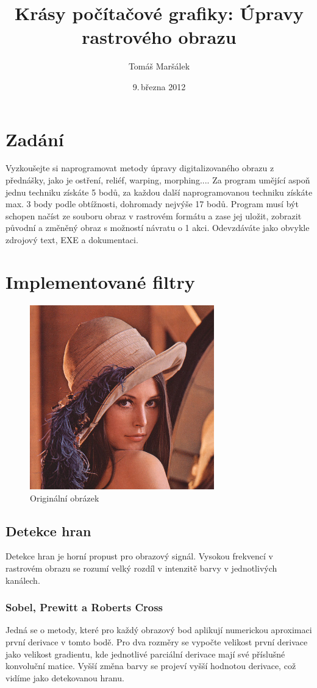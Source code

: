 \documentclass[11pt]{article}
\title{Krásy počítačové grafiky: Úpravy rastrového obrazu}
\author{Tomáš Maršálek}
\date{9.\,března 2012}
\begin{document}
\maketitle

\section{Zadání}
Vyzkoušejte si naprogramovat metody úpravy digitalizovaného obrazu z přednášky,
jako je ostření, reliéf, warping, morphing.... Za program umějící aspoň jednu
techniku získáte 5 bodů, za každou další naprogramovanou techniku získáte max.
3 body podle obtížnosti, dohromady nejvýše 17 bodů. Program musí být schopen
načíst ze souboru obraz v rastrovém formátu a zase jej uložit, zobrazit původní
a změněný obraz s možností návratu o 1 akci. Odevzdáváte jako obvykle zdrojový
text, EXE a dokumentaci.

\section{Implementované filtry}

\begin{figure}[ht!]
\centering
	\includegraphics[width=8cm]{lena.png}
	\caption{Originální obrázek}
\end{figure}

\subsection{Detekce hran}
Detekce hran je horní propust pro obrazový signál. Vysokou frekvencí v
rastrovém obrazu se rozumí velký rozdíl v intenzitě barvy v jednotlivých
kanálech.

\subsubsection{Sobel, Prewitt a Roberts Cross}
Jedná se o metody, které pro každý obrazový bod aplikují numerickou aproximaci
první derivace v tomto bodě. Pro dva rozměry se vypočte velikost první derivace
jako velikost gradientu, kde jednotlivé parciální derivace mají své příslušné
konvoluční matice. Vyšší změna barvy se projeví vyšší hodnotou derivace, což
vidíme jako detekovanou hranu. 
\end{document}
